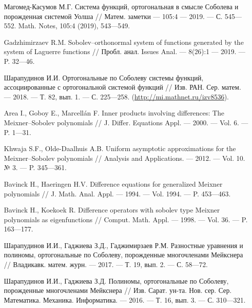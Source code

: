 \begin{thebibliography}{99}
Магомед-Касумов М.Г.
Система функций, ортогональная в смысле Соболева и порожденная системой Уолша
//
Матем. заметки
--- 105:4
--- 2019.
--- С. 545---552.
Math. Notes, 105:4 (2019), 543---549.




Gadzhimirzaev R.M.
Sobolev--orthonormal system of functions generated by the system of Laguerre functions
//
Пробл. анал. Issues Anal.
--- 8(26):1
--- 2019.
--- P. 32---46.




Шарапудинов И.И.
Ортогональные по Соболеву системы функций, ассоциированные с ортогональной системой функций
//
Изв. РАН. Сер. матем.
--- 2018.
--- Т. 82, вып. 1.
--- С. 225---258. (\url{http://mi.mathnet.ru/izv8536}).




{Area I., Goboy E., Marcell\'an F.}
Inner products involving differences: The Meixner--Sobolev polynomials
//
J. Differ. Equations Appl.
--- 2000.
--- Vol. 6.
--- P. 1---31.




{Khwaja S.F., Olde-Daalhuis A.B.}
Uniform asymptotic approximations for the Meixner--Sobolev polynomials
//
Analysis and Applications.
--- 2012.
--- Vol. 10. № 3.
--- P. 345---361.




{Bavinck H., Haeringen H.V.}
Difference equations for generalized Meixner polynomials
//
J. Math. Anal. Appl.
--- 1994.
--- Vol. 1994.
--- P. 453---463.




{Bavinck H., Koekoek R.}
Difference operators with sobolev type Meixner polynomials as eigenfunctions
//
Comput. Math. Appl.
--- 1998.
--- Vol. 36.
--- P. 163---177.




{Шарапудинов И.И., Гаджиева З.Д., Гаджимирзаев Р.М.}
Разностные уравнения и полиномы, ортогональные по Соболеву, порожденные многочленами Мейкснера
//
Владикавк. матем. журн.
--- 2017.
--- Т. 19, вып. 2.
--- С. 58---72.




{Шарапудинов И.И., Гаджиева З.Д.}
Полиномы, ортогональные по Соболеву, порожденные многочленами Мейкснера
//
Изв. Сарат. ун-та. Нов. сер. Сер. Математика. Механика. Информатика.
--- 2016.
--- Т. 16, вып. 3.
--- С. 310---321.





\end{thebibliography}
